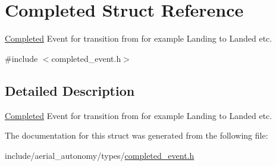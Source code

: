 \hypertarget{structCompleted}{\section{Completed Struct Reference}
\label{structCompleted}
}


\hyperlink{structCompleted}{Completed} Event for transition from for example Landing to Landed etc.  




{\ttfamily \#include $<$completed\-\_\-event.\-h$>$}



\subsection{Detailed Description}
\hyperlink{structCompleted}{Completed} Event for transition from for example Landing to Landed etc. 

The documentation for this struct was generated from the following file\-:\begin{DoxyCompactItemize}
\item 
include/aerial\-\_\-autonomy/types/\hyperlink{completed__event_8h}{completed\-\_\-event.\-h}\end{DoxyCompactItemize}
